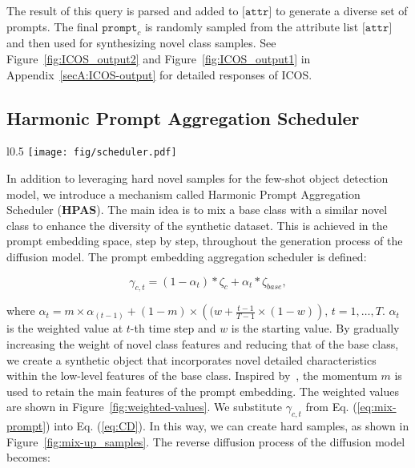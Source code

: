 The result of this query is parsed and added to $\texttt{[attr]}$ to generate a diverse set of prompts. The final $\texttt{prompt}_c$ is randomly sampled from the attribute list $\texttt{[attr]}$ and then used for synthesizing novel class samples. See Figure~\ref{fig:ICOS_output2} and Figure~\ref{fig:ICOS_output1} in Appendix~\ref{secA:ICOS-output}  for detailed responses of ICOS.


\subsection{Harmonic Prompt Aggregation Scheduler}

\begin{wrapfigure}{l}{0.5\textwidth}
    \hfill\texttt{[image: fig/scheduler.pdf]}
    \caption{Visualization of the weighted values of the Harmonic Prompt Aggregation Scheduler across the timesteps of controllable diffusion.}
     \label{fig:weighted-values}
\end{wrapfigure}

In addition to leveraging hard novel samples for the few-shot object detection model, we introduce a mechanism called Harmonic Prompt Aggregation Scheduler (\textbf{HPAS}). The main idea is to mix a base class with a similar novel class to enhance the diversity of the synthetic dataset. This is achieved in the prompt embedding space, step by step, throughout the generation process of the diffusion model. The prompt embedding aggregation scheduler is defined:

\begin{equation}
\label{eq:mix-prompt}
    \gamma_{c,t} = (1-\alpha_t) * \zeta_{c}  + \alpha_t * \zeta_{base},
\end{equation}

where $\alpha_t = m \times \alpha_{(t-1)} + (1-m) \times \left(( w + \frac{t-1}{T-1} \times (1 - w) \right), \, t = 1, \ldots, T$. $\alpha_t$ is the weighted value at $t$-th time step and $w$ is the starting value. By gradually increasing the weight of novel class features and reducing that of the base class, we create a synthetic object that incorporates novel detailed characteristics within the low-level features of the base class. Inspired by~\cite{he2020momentum}, the momentum $m$ is used to retain the main features of the prompt embedding. The weighted values are shown in Figure~\ref{fig:weighted-values}. We substitute $\gamma_{c,t}$ from Eq. (\ref{eq:mix-prompt}) into Eq. (\ref{eq:CD}). In this way, we can create hard samples, as shown in Figure~\ref{fig:mix-up_samples}. The reverse diffusion process  of the diffusion model becomes:

